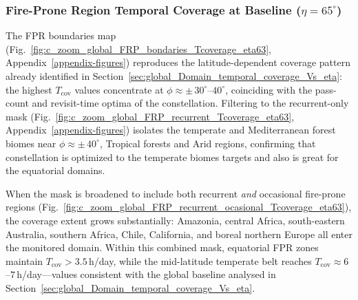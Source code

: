 \subsubsection{Fire-Prone Region Temporal Coverage at Baseline ($\eta = 65^{\circ}$)}
\label{sec:fpr_temporal_coverage_baseline}

The FPR boundaries map (Fig.~\ref{fig:c_zoom_global_FRP_bondaries_Tcoverage_eta63}, Appendix~\ref{appendix-figures}) reproduces the latitude-dependent coverage pattern already identified in Section~\ref{sec:global_Domain_temporal_coverage_Vs_eta}: the highest $T_{\text{cov}}$ values concentrate at $\phi \approx \pm\,30^{\circ}$--$40^{\circ}$, coinciding with the pass-count and revisit-time optima of the constellation.  Filtering to the recurrent-only mask (Fig.~\ref{fig:c_zoom_global_FRP_recurrent_Tcoverage_eta63}, Appendix~\ref{appendix-figures}) isolates the temperate and Mediterranean forest biomes near $\phi \approx \pm\,40^{\circ}$, Tropical forests and Arid regions, confirming that constellation is optimized to the temperate biomes targets and also is great for the equatorial domains.

When the mask is broadened to include both recurrent \emph{and} occasional fire-prone regions (Fig.~\ref{fig:c_zoom_global_FRP_recurrent_ocasional_Tcoverage_eta63}), the coverage extent grows substantially: Amazonia, central Africa, south-eastern Australia, southern Africa, Chile, California, and boreal northern Europe all enter the monitored domain.  Within this combined mask, equatorial FPR zones maintain $T_{\text{cov}} > 3.5$\,h/day, while the mid-latitude temperate belt reaches $T_{\text{cov}} \approx 6$--$7$\,h/day---values consistent with the global baseline analysed in Section~\ref{sec:global_Domain_temporal_coverage_Vs_eta}.

